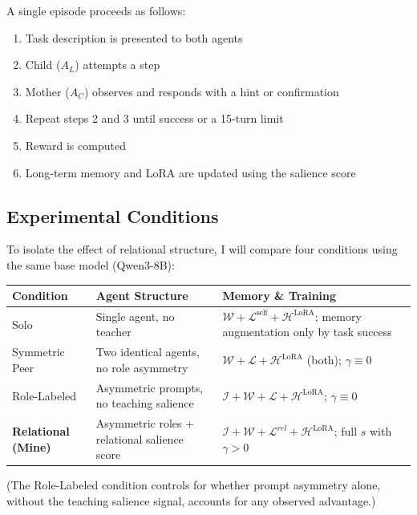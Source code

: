 \documentclass[11pt]{article}
\begin{document}
A single episode proceeds as follows: 
\begin{enumerate}
    \item Task description is presented to both agents
    \item Child ($A_L$) attempts a step
    \item Mother ($A_C$) observes and responds with a hint or confirmation
    \item Repeat steps 2 and 3 until success or a 15-turn limit
    \item Reward is computed
    \item Long-term memory and LoRA are updated using the salience score 
    \end{enumerate}

\subsection{Experimental Conditions}

To isolate the effect of relational structure, I will compare four conditions using the same base model (Qwen3-8B):

\begin{center}
\begin{tabular}{p{2.8cm}p{4.5cm}p{5.5cm}}
\toprule
\textbf{Condition} & \textbf{Agent Structure} & \textbf{Memory \& Training} \\
\midrule
Solo & Single agent, no teacher & $\mathcal{W} + \mathcal{L}^{\text{self}} + \mathcal{H}^{\text{LoRA}}$; memory augmentation only by task success \\
Symmetric Peer & Two identical agents, no role asymmetry & $\mathcal{W} + \mathcal{L} + \mathcal{H}^{\text{LoRA}}$ (both); $\gamma \equiv 0$ \\
Role-Labeled & Asymmetric prompts, no teaching salience & $\mathcal{I} + \mathcal{W} + \mathcal{L} + \mathcal{H}^{\text{LoRA}}$; $\gamma \equiv 0$ \\
\textbf{Relational (Mine)} & Asymmetric roles + relational salience score & $\mathcal{I} + \mathcal{W} + \mathcal{L}^{rel} + \mathcal{H}^{\text{LoRA}}$; full $s$ with $\gamma > 0$ \\
\bottomrule
\end{tabular}
\end{center}

(The Role-Labeled condition controls for whether prompt asymmetry alone, without the teaching salience signal, accounts for any observed advantage.)

\end{document}
